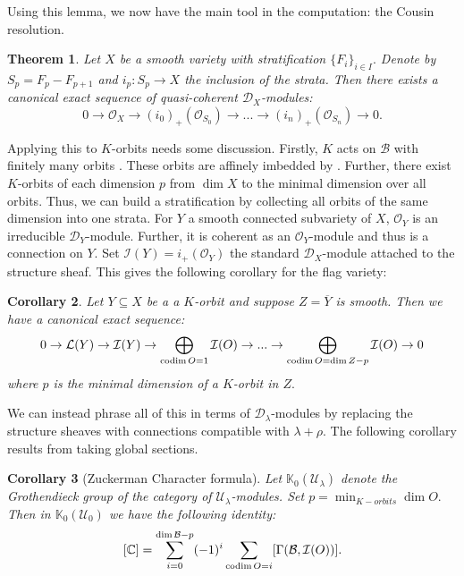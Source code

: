 \documentclass[letterpaper,twosided,11pt]{article}
\theoremstyle{plain}
\newtheorem{theorem}{Theorem}[section]
\newtheorem{corollary}[theorem]{Corollary}
\theoremstyle{definition}
\theoremstyle{remark}
\newcommand{\C}{\mathbb{C}}
\begin{document}
Using this lemma, we now have the main tool in the computation:  the
Cousin resolution.

\begin{theorem}
    Let $ X $ be a smooth variety with stratification $ \{F_i\}_{i\in I}.
    $ Denote by $ S_p=F_p-F_{p+1} $ and $ i_p:S_p\to X $ the inclusion
    of the strata.  Then there exists a canonical exact sequence of
    quasi-coherent $ \mathcal{D}_X $-modules:
    \[
        0\to \mathcal{O}_X\to (i_0)_+(\mathcal{O}_{S_0})\to ...  \to (i_n)_+
        (\mathcal{O}_{S_n})\to 0.
    \]
\end{theorem}

Applying this to $ K $-orbits needs some discussion.  Firstly, $ K $
acts on $ \mathcal{B} $ with finitely many orbits
\cite{Wolf1974}.  These orbits are affinely imbedded by
\cite[Chapter 4, Proposition 1.1]{MilicicLocalization}.  Further, there
exist $ K $-orbits of each dimension $ p $ from $ \dim X $ to the
minimal dimension over all orbits.  Thus, we can build a stratification
by collecting all orbits of the same dimension into one strata.  For $ Y
$ a smooth connected subvariety of $ X $, $ \mathcal{O}_Y $ is an
irreducible $ \mathcal{D}_Y $-module.  Further, it is coherent as an $
\mathcal{O}_Y $-module and thus is a connection on $ Y. $ Set $ \mathcal
{I}(Y)=i_+(\mathcal{O}_Y) $ the standard $ \mathcal{D}_X $-module
attached to the structure sheaf.  This gives the following corollary for
the flag variety:
\begin{corollary}
    \label{Cousin_Resolution_Corollary} Let $ Y\subseteq X $ be a a $ K $-orbit
    and suppose $ Z=\overline{Y} $ is smooth.  Then we have a canonical
    exact sequence:
    \[
        0\to \mathcal{L}(Y)\to \mathcal{I}(Y) \to \bigoplus_{%
        \operatorname{codim}
        O=1} \mathcal{I}(O) \to ...\to \bigoplus_{%
        \operatorname{codim}
        O=\dim Z-p} \mathcal{I}(O)\to 0
    \]
    where $ p $ is the minimal dimension of a $ K $-orbit in $ Z. $
\end{corollary}

We can instead phrase all of this in terms of $ \mathcal{D}_\lambda $-modules
by replacing the structure sheaves with connections compatible with $
\lambda+\rho. $ The following corollary results from taking global
sections.

\begin{corollary}[Zuckerman Character formula]
    Let $ \mathbb{K}_0(\mathcal{U}_\lambda) $ denote the Grothendieck
    group of the category of $ \mathcal{U}_\lambda $-modules.  Set $ p=\displaystyle\min_
    {K-orbits} \dim O. $ Then in $ \mathbb{K}_0(\mathcal{U}_0) $ we have
    the following identity:
    \[
        [\C]=\sum_{i=0}^{\dim \mathcal{B}-p}(-1)^i\sum_{%
        \operatorname{codim}
        O=i}[\Gamma(\mathcal{B},\mathcal{I}(O))].
    \]
\end{corollary}
\end{document}
